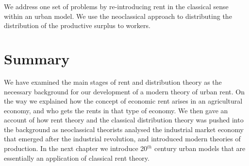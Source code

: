 We address one set of problems by re-introducing rent in the classical sense within an urban model. 
We  use the neoclassical approach to distributing the distribution of the productive surplus to workers.

 
 
\section{Summary}



We have examined the main stages of rent and distribution theory
as the necessary background for our development %
of a modern theory of urban rent. On the way we explained how the concept of economic rent arises in an agricultural economy, and who gets the rents in that type of economy. We then gave an account of how rent theory and the classical distribution theory was pushed into the background as neoclassical theorists analysed the industrial market economy that emerged after the industrial revolution, and introduced modern theories of production. In the next chapter we introduce 20$^{th}$ century urban models that are essentially an application of classical rent theory.

